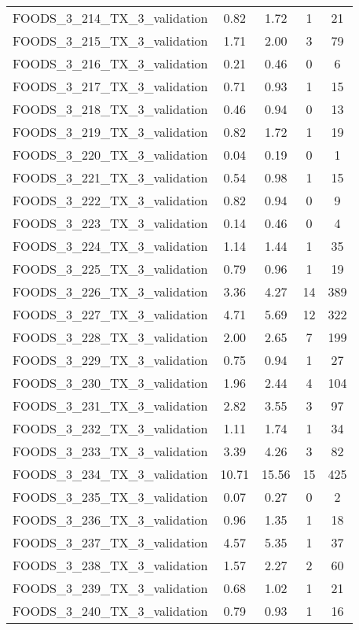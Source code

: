 \begin{table}
\begin{tabular}{|l|c|c|c|c|}
FOODS\_3\_214\_TX\_3\_validation & 0.82 & 1.72 & 1 & 21 \\
FOODS\_3\_215\_TX\_3\_validation & 1.71 & 2.00 & 3 & 79 \\
FOODS\_3\_216\_TX\_3\_validation & 0.21 & 0.46 & 0 & 6 \\
FOODS\_3\_217\_TX\_3\_validation & 0.71 & 0.93 & 1 & 15 \\
FOODS\_3\_218\_TX\_3\_validation & 0.46 & 0.94 & 0 & 13 \\
FOODS\_3\_219\_TX\_3\_validation & 0.82 & 1.72 & 1 & 19 \\
FOODS\_3\_220\_TX\_3\_validation & 0.04 & 0.19 & 0 & 1 \\
FOODS\_3\_221\_TX\_3\_validation & 0.54 & 0.98 & 1 & 15 \\
FOODS\_3\_222\_TX\_3\_validation & 0.82 & 0.94 & 0 & 9 \\
FOODS\_3\_223\_TX\_3\_validation & 0.14 & 0.46 & 0 & 4 \\
FOODS\_3\_224\_TX\_3\_validation & 1.14 & 1.44 & 1 & 35 \\
FOODS\_3\_225\_TX\_3\_validation & 0.79 & 0.96 & 1 & 19 \\
FOODS\_3\_226\_TX\_3\_validation & 3.36 & 4.27 & 14 & 389 \\
FOODS\_3\_227\_TX\_3\_validation & 4.71 & 5.69 & 12 & 322 \\
FOODS\_3\_228\_TX\_3\_validation & 2.00 & 2.65 & 7 & 199 \\
FOODS\_3\_229\_TX\_3\_validation & 0.75 & 0.94 & 1 & 27 \\
FOODS\_3\_230\_TX\_3\_validation & 1.96 & 2.44 & 4 & 104 \\
FOODS\_3\_231\_TX\_3\_validation & 2.82 & 3.55 & 3 & 97 \\
FOODS\_3\_232\_TX\_3\_validation & 1.11 & 1.74 & 1 & 34 \\
FOODS\_3\_233\_TX\_3\_validation & 3.39 & 4.26 & 3 & 82 \\
FOODS\_3\_234\_TX\_3\_validation & 10.71 & 15.56 & 15 & 425 \\
FOODS\_3\_235\_TX\_3\_validation & 0.07 & 0.27 & 0 & 2 \\
FOODS\_3\_236\_TX\_3\_validation & 0.96 & 1.35 & 1 & 18 \\
FOODS\_3\_237\_TX\_3\_validation & 4.57 & 5.35 & 1 & 37 \\
FOODS\_3\_238\_TX\_3\_validation & 1.57 & 2.27 & 2 & 60 \\
FOODS\_3\_239\_TX\_3\_validation & 0.68 & 1.02 & 1 & 21 \\
FOODS\_3\_240\_TX\_3\_validation & 0.79 & 0.93 & 1 & 16 \\

\end{tabular}
\end{table}
